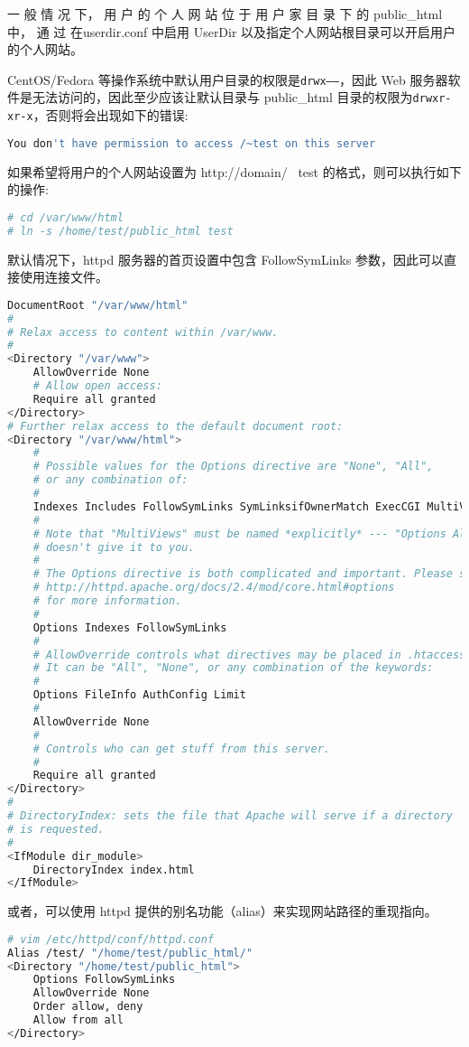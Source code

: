 一 般 情 况 下， 用 户 的 个 人 网 站 位 于 用 户 家 目 录 下 的 public_html 中， 通 过 在userdir.conf 中启用 UserDir 以及指定个人网站根目录可以开启用户的个人网站。

CentOS/Fedora 等操作系统中默认用户目录的权限是\texttt{drwx------}，因此 Web 服务器软件是无法访问的，因此至少应该让默认目录与 public_html 目录的权限为\texttt{drwxr-xr-x}，否则将会出现如下的错误:

\begin{lstlisting}[language=bash]
You don't have permission to access /~test on this server
\end{lstlisting}


如果希望将用户的个人网站设置为 http://domain/~ test 的格式，则可以执行如下的操作:

\begin{lstlisting}[language=bash]
# cd /var/www/html
# ln -s /home/test/public_html test
\end{lstlisting}


默认情况下，httpd 服务器的首页设置中包含 FollowSymLinks 参数，因此可以直接使用连接文件。


\begin{lstlisting}[language=bash]
DocumentRoot "/var/www/html"
#
# Relax access to content within /var/www.
#
<Directory "/var/www">
	AllowOverride None
	# Allow open access:
	Require all granted
</Directory>
# Further relax access to the default document root:
<Directory "/var/www/html">
	#
	# Possible values for the Options directive are "None", "All",
	# or any combination of:
	#
	Indexes Includes FollowSymLinks SymLinksifOwnerMatch ExecCGI MultiViews
	#
	# Note that "MultiViews" must be named *explicitly* --- "Options All"
	# doesn't give it to you.
	#
	# The Options directive is both complicated and important. Please see
	# http://httpd.apache.org/docs/2.4/mod/core.html#options
	# for more information.
	#
	Options Indexes FollowSymLinks
	#
	# AllowOverride controls what directives may be placed in .htaccess files.
	# It can be "All", "None", or any combination of the keywords:
	#
	Options FileInfo AuthConfig Limit
	#
	AllowOverride None
	#
	# Controls who can get stuff from this server.
	#
	Require all granted
</Directory>
#
# DirectoryIndex: sets the file that Apache will serve if a directory
# is requested.
#
<IfModule dir_module>
	DirectoryIndex index.html
</IfModule>
\end{lstlisting}

或者，可以使用 httpd 提供的别名功能（alias）来实现网站路径的重现指向。

\begin{lstlisting}[language=bash]
# vim /etc/httpd/conf/httpd.conf
Alias /test/ "/home/test/public_html/"
<Directory "/home/test/public_html">
	Options FollowSymLinks
	AllowOverride None
	Order allow, deny
	Allow from all
</Directory>
\end{lstlisting}


